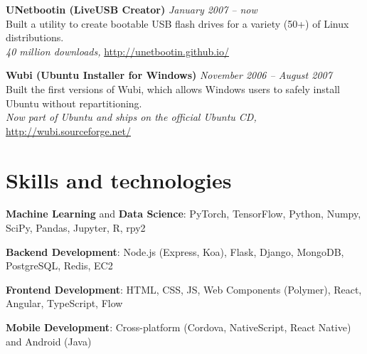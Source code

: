 \documentclass[margin,line]{resume}
\begin{document}
\begin{resume}
\textbf{UNetbootin (LiveUSB Creator)} \hfill \textsl{January 2007 -- now}\\
Built a utility to create bootable USB flash drives for a variety (50+) of Linux distributions.\\ %
\emph{40 million downloads,} \url{http://unetbootin.github.io/}

\textbf{Wubi (Ubuntu Installer for Windows)} \hfill \textsl{November 2006 -- August 2007}\\
Built the first versions of Wubi, which allows Windows users to safely install Ubuntu without repartitioning. \\ %
\emph{Now part of Ubuntu and ships on the official Ubuntu CD,} \url{http://wubi.sourceforge.net/}

\section{\mysidestyle Skills and technologies}

\textbf{Machine Learning} and \textbf{Data Science}: PyTorch, TensorFlow, Python, Numpy, SciPy, Pandas, Jupyter, R, rpy2

\vspace{-4mm}

\textbf{Backend Development}: Node.js (Express, Koa), Flask, Django, MongoDB, PostgreSQL, Redis, EC2

\vspace{-4mm}

\textbf{Frontend Development}: HTML, CSS, JS, Web Components (Polymer), React, Angular, TypeScript, Flow

\vspace{-4mm}

\textbf{Mobile Development}: Cross-platform (Cordova, NativeScript, React Native) and Android (Java)

\vspace{-4mm}


\end{resume}
\end{document}
